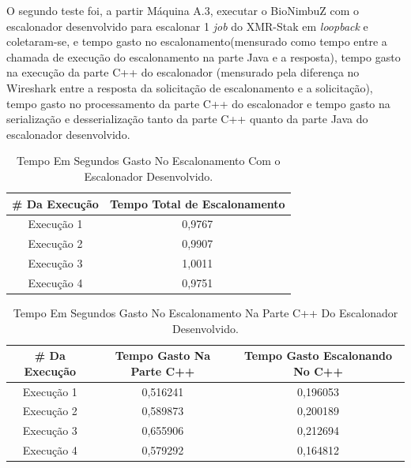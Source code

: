 O segundo teste foi, a partir Máquina A.3, executar o BioNimbuZ com o escalonador desenvolvido para escalonar 1 \textit{job} do XMR-Stak em \textit{loopback} e coletaram-se, e tempo gasto no escalonamento(mensurado como tempo entre a chamada de execução do escalonamento na parte Java e a resposta), tempo gasto na execução da parte C++ do escalonador (mensurado pela diferença no Wireshark entre a resposta da solicitação de escalonamento e a solicitação), tempo gasto no processamento da parte C++ do escalonador e tempo gasto na serialização e desserialização tanto da parte C++ quanto da parte Java do escalonador desenvolvido.

\begin {table}[H]
\begin{center}
	\begin{tabular}{ |c|c| } 
		\hline
		\#  Da Execução & Tempo Total de Escalonamento \\ 
		\hline
		Execução 1 & 0,9767 \\ 
		\hline
		Execução 2 & 0,9907 \\ 
		\hline
		Execução 3 & 1,0011 \\ 
		\hline
		Execução 4 & 0,9751 \\ 
		\hline
	\end{tabular}
	\caption {Tempo Em Segundos Gasto No Escalonamento Com o Escalonador Desenvolvido.} \label{TabelaTempoEscalonadorNovo} 
\end{center}
\end {table}

\begin {table}[H]
\begin{center}
	\begin{tabular}{ |c|c|c| } 
		\hline
		\#  Da Execução & Tempo Gasto Na Parte C++ & Tempo Gasto Escalonando No C++ \\ 
		\hline
		Execução 1 & 0,516241 & 0,196053 \\ 
		\hline
		Execução 2 & 0,589873 & 0,200189 \\ 
		\hline
		Execução 3 & 0,655906 & 0,212694 \\ 
		\hline
		Execução 4 & 0,579292 & 0,164812 \\ 
		\hline
	\end{tabular}
	\caption {Tempo Em Segundos Gasto No Escalonamento Na Parte C++ Do Escalonador Desenvolvido.} \label{TabelaTempoEscalonadorNovo2} 
\end{center}
\end {table}

